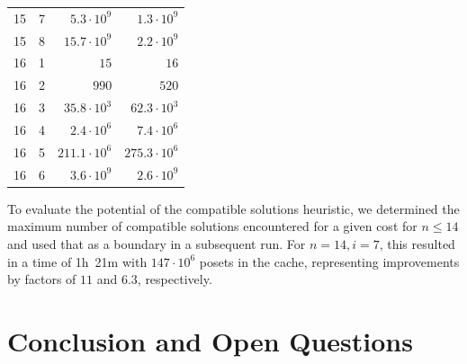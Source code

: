 \documentclass[twoside,leqno,twocolumn]{article}
\newcommand{\projectURL}[0]{https://drive.google.com/file/d/117g3E-0LrnQKdUrKN9jyYhDGjvKM81M1} %
\newcommand{\projectServer}[0]{Drive} %
\begin{document}
\begin{table}[!t]
\begin{tabular}{c|c|r|r}
    15  & 7   & $5.3 \cdot 10^9$        & $1.3 \cdot 10^9$         \\
    15  & 8   & $15.7 \cdot 10^9$       & $2.2 \cdot 10^9$         \\
    \hline
    16  & 1   & $15$                    & $16$                     \\
    16  & 2   & $990$                   & $520$                    \\
    16  & 3   & $35.8 \cdot 10^3$       & $62.3 \cdot 10^3$        \\
    16  & 4   & $2.4 \cdot 10^6$        & $7.4 \cdot 10^6$         \\
    16  & 5   & $211.1 \cdot 10^6$      & $275.3 \cdot 10^6$       \\
    16  & 6   & $3.6 \cdot 10^9$        & $2.6 \cdot 10^9$         \\
  \end{tabular}
\end{table}

To evaluate the potential of the compatible solutions heuristic, we determined the maximum number of compatible solutions encountered for a given cost for $n \leq 14$ and used that as a boundary in a subsequent run.
For $n = 14, i = 7$, this resulted in a time of 1h~21m with $147 \cdot 10^6$ posets in the cache, representing improvements by factors of $11$ and $6.3$, respectively.


\section{Conclusion and Open Questions}

\end{document}
